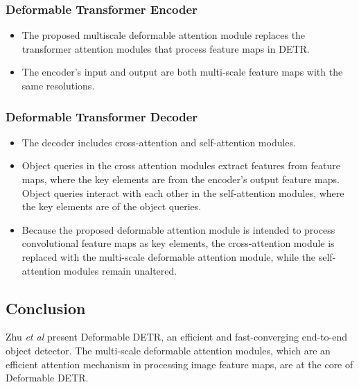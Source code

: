 \subsubsection{Deformable Transformer Encoder}
\begin{itemize}
	\item The proposed multiscale deformable attention module replaces the transformer attention modules that process feature maps in DETR.
	\item The encoder's input and output are both multi-scale feature maps with the same resolutions.
\end{itemize}	


\subsubsection{Deformable Transformer Decoder}

\begin{itemize}
	\item The decoder includes cross-attention and self-attention modules.
	\item Object queries in the cross attention modules extract features from feature maps, where the key elements are from the encoder's output feature maps. Object queries interact with each other in the self-attention modules, where the key elements are of the object queries.
	\item Because the proposed deformable attention module is intended to process convolutional feature maps as key elements, the cross-attention module is replaced with the multi-scale deformable attention module, while the self-attention modules remain unaltered.
\end{itemize}
\subsection{Conclusion}
\par Zhu \textit{et al} present Deformable DETR, an efficient and fast-converging end-to-end object detector.  The multi-scale deformable attention modules, which are an efficient attention mechanism in processing image feature maps, are at the core of Deformable DETR.
